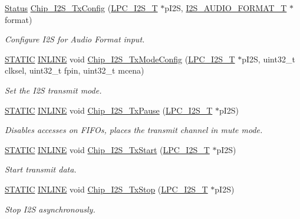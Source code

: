 \begin{DoxyCompactItemize}
\hyperlink{group__LPC__Types__Public__Types_ga67a0db04d321a74b7e7fcfd3f1a3f70b}{Status} \hyperlink{group__I2S__17XX__40XX_ga09acfe336e9aee86f1d029146937326a}{Chip\+\_\+\+I2\+S\+\_\+\+Tx\+Config} (\hyperlink{structLPC__I2S__T}{L\+P\+C\+\_\+\+I2\+S\+\_\+T} $\ast$p\+I2S, \hyperlink{structI2S__AUDIO__FORMAT__T}{I2\+S\+\_\+\+A\+U\+D\+I\+O\+\_\+\+F\+O\+R\+M\+A\+T\+\_\+T} $\ast$format)
\begin{DoxyCompactList}\small\item\em Configure I2S for Audio Format input. \end{DoxyCompactList}\item 
\hyperlink{group__LPC__Types__Public__Macros_ga10b2d890d871e1489bb02b7e70d9bdfb}{S\+T\+A\+T\+IC} \hyperlink{group__LPC__Types__Public__Types_ga2eb6f9e0395b47b8d5e3eeae4fe0c116}{I\+N\+L\+I\+NE} void \hyperlink{group__I2S__17XX__40XX_ga0c7a808e84e2c0a3f7ffbba089c7d380}{Chip\+\_\+\+I2\+S\+\_\+\+Tx\+Mode\+Config} (\hyperlink{structLPC__I2S__T}{L\+P\+C\+\_\+\+I2\+S\+\_\+T} $\ast$p\+I2S, uint32\+\_\+t clksel, uint32\+\_\+t fpin, uint32\+\_\+t mcena)
\begin{DoxyCompactList}\small\item\em Set the I2S transmit mode. \end{DoxyCompactList}\item 
\hyperlink{group__LPC__Types__Public__Macros_ga10b2d890d871e1489bb02b7e70d9bdfb}{S\+T\+A\+T\+IC} \hyperlink{group__LPC__Types__Public__Types_ga2eb6f9e0395b47b8d5e3eeae4fe0c116}{I\+N\+L\+I\+NE} void \hyperlink{group__I2S__17XX__40XX_ga0487f27c97c88ea9d2bf9adc6ec4e469}{Chip\+\_\+\+I2\+S\+\_\+\+Tx\+Pause} (\hyperlink{structLPC__I2S__T}{L\+P\+C\+\_\+\+I2\+S\+\_\+T} $\ast$p\+I2S)
\begin{DoxyCompactList}\small\item\em Disables accesses on F\+I\+F\+Os, places the transmit channel in mute mode. \end{DoxyCompactList}\item 
\hyperlink{group__LPC__Types__Public__Macros_ga10b2d890d871e1489bb02b7e70d9bdfb}{S\+T\+A\+T\+IC} \hyperlink{group__LPC__Types__Public__Types_ga2eb6f9e0395b47b8d5e3eeae4fe0c116}{I\+N\+L\+I\+NE} void \hyperlink{group__I2S__17XX__40XX_ga84f5b666dcacef8140c1355ed308a782}{Chip\+\_\+\+I2\+S\+\_\+\+Tx\+Start} (\hyperlink{structLPC__I2S__T}{L\+P\+C\+\_\+\+I2\+S\+\_\+T} $\ast$p\+I2S)
\begin{DoxyCompactList}\small\item\em Start transmit data. \end{DoxyCompactList}\item 
\hyperlink{group__LPC__Types__Public__Macros_ga10b2d890d871e1489bb02b7e70d9bdfb}{S\+T\+A\+T\+IC} \hyperlink{group__LPC__Types__Public__Types_ga2eb6f9e0395b47b8d5e3eeae4fe0c116}{I\+N\+L\+I\+NE} void \hyperlink{group__I2S__17XX__40XX_gac7d296f84ba3283e63861515d134edfe}{Chip\+\_\+\+I2\+S\+\_\+\+Tx\+Stop} (\hyperlink{structLPC__I2S__T}{L\+P\+C\+\_\+\+I2\+S\+\_\+T} $\ast$p\+I2S)
\begin{DoxyCompactList}\small\item\em Stop I2S asynchronously. \end{DoxyCompactList}\end{DoxyCompactItemize}



